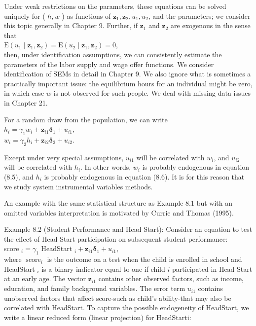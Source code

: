 \documentclass[10pt]{article}
\begin{document}
Under weak restrictions on the parameters, these equations can be solved uniquely for ( $h, w$ ) as functions of $\mathbf{z}_{1}, \mathbf{z}_{2}, u_{1}, u_{2}$, and the parameters; we consider this topic generally in Chapter 9. Further, if $\mathbf{z}_{1}$ and $\mathbf{z}_{2}$ are exogenous in the sense that\\
$\mathrm{E}\left(u_{1} \mid \mathbf{z}_{1}, \mathbf{z}_{2}\right)=\mathrm{E}\left(u_{2} \mid \mathbf{z}_{1}, \mathbf{z}_{2}\right)=0$,\\
then, under identification assumptions, we can consistently estimate the parameters of the labor supply and wage offer functions. We consider identification of SEMs in detail in Chapter 9. We also ignore what is sometimes a practically important issue: the equilibrium hours for an individual might be zero, in which case $w$ is not observed for such people. We deal with missing data issues in Chapter 21.

For a random draw from the population, we can write\\
$h_{i}=\gamma_{1} w_{i}+\mathbf{z}_{i 1} \boldsymbol{\delta}_{1}+u_{i 1}$,\\
$w_{i}=\gamma_{2} h_{i}+\mathbf{z}_{i 2} \boldsymbol{\delta}_{2}+u_{i 2}$.

Except under very special assumptions, $u_{i 1}$ will be correlated with $w_{i}$, and $u_{i 2}$ will be correlated with $h_{i}$. In other words, $w_{i}$ is probably endogenous in equation (8.5), and $h_{i}$ is probably endogenous in equation (8.6). It is for this reason that we study system instrumental variables methods.

An example with the same statistical structure as Example 8.1 but with an omitted variables interpretation is motivated by Currie and Thomas (1995).

Example 8.2 (Student Performance and Head Start): Consider an equation to test the effect of Head Start participation on subsequent student performance:\\
score $_{i}=\gamma_{1}$ HeadStart $_{i}+\mathbf{z}_{i 1} \boldsymbol{\delta}_{1}+u_{i 1}$,\\
where $\operatorname{score}_{i}$ is the outcome on a test when the child is enrolled in school and HeadStart $_{i}$ is a binary indicator equal to one if child $i$ participated in Head Start at an early age. The vector $\mathbf{z}_{i 1}$ contains other observed factors, such as income, education, and family background variables. The error term $u_{i 1}$ contains unobserved factors that affect score-such as child's ability-that may also be correlated with HeadStart. To capture the possible endogeneity of HeadStart, we write a linear reduced form (linear projection) for HeadStarti:
\end{document}
